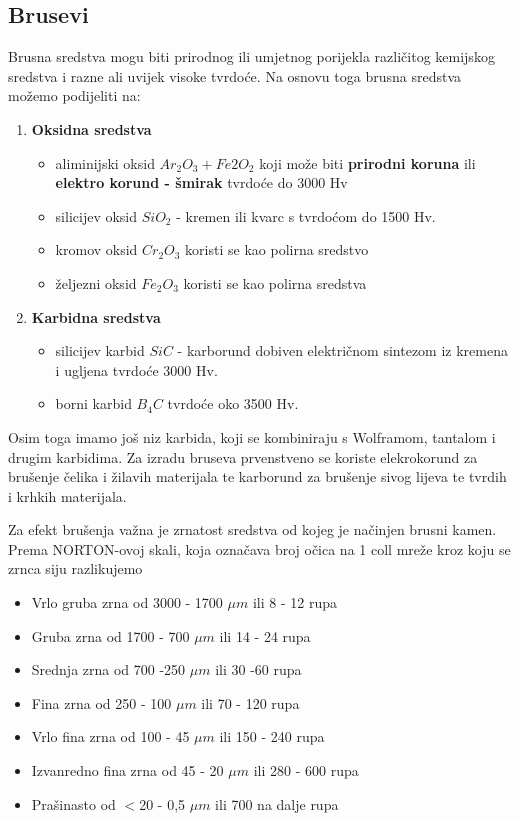 \documentclass[a4paper,12pt]{article}
\numberwithin{figure}{section}
\begin{document}
\subsection{Brusevi}
Brusna sredstva mogu biti prirodnog ili umjetnog porijekla različitog kemijskog sredstva i razne ali uvijek visoke tvrdoće. Na osnovu toga brusna sredstva možemo podijeliti na:
\begin{enumerate}
\item \textbf{Oksidna sredstva}
\begin{itemize}
\item aliminijski oksid $Ar_{2}O_{3} + Fe{2}O_{2}$ koji može biti \textbf{prirodni koruna} ili \textbf{elektro korund - šmirak} tvrdoće do 3000 Hv
\item silicijev oksid $SiO_{2}$ - kremen ili kvarc s tvrdoćom do 1500 Hv.
\item kromov oksid $Cr_{2}O_{3}$ koristi se kao polirna sredstvo
\item željezni oksid $Fe_{2}O_{3}$ koristi se kao polirna sredstva
\end{itemize}
\item \textbf{Karbidna sredstva}
\begin{itemize}
\item silicijev karbid $SiC$ - karborund dobiven električnom sintezom iz kremena i ugljena tvrdoće 3000 Hv.
\item borni karbid $B_{4}C$ tvrdoće oko 3500 Hv.
\end{itemize}
\end{enumerate}
Osim toga imamo još niz karbida, koji se kombiniraju s Wolframom, tantalom i drugim karbidima. Za izradu bruseva prvenstveno se koriste elekrokorund za brušenje čelika i žilavih materijala te karborund za brušenje sivog lijeva te tvrdih i krhkih materijala. \par
Za efekt brušenja važna je zrnatost sredstva od kojeg je načinjen brusni kamen. Prema NORTON-ovoj skali, koja označava broj očica na 1 coll mreže kroz koju se zrnca siju razlikujemo
\begin{itemize}
\item Vrlo gruba zrna od 3000 - 1700 $\mu m$ ili 8 - 12 rupa
\item Gruba zrna od 1700 - 700 $\mu m$ ili 14 - 24 rupa
\item Srednja zrna od 700 -250 $\mu m$ ili 30 -60 rupa
\item Fina zrna od 250 - 100 $\mu m$ ili 70 - 120 rupa
\item Vrlo fina zrna od 100 - 45 $\mu m$ ili 150 - 240 rupa
\item Izvanredno fina zrna od 45 - 20 $\mu m$ ili 280 - 600 rupa
\item Prašinasto od $<$20 - 0,5 $\mu m$ ili 700 na dalje rupa
\end{itemize}
\end{document}

